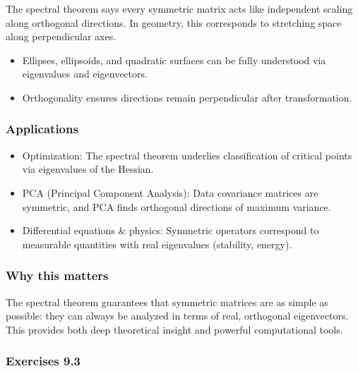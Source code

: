 \documentclass[
  12pt,
  a4paper,
]{article}
\begin{document}
The spectral theorem says every symmetric matrix acts like independent
scaling along orthogonal directions. In geometry, this corresponds to
stretching space along perpendicular axes.

\begin{itemize}
\item
  Ellipses, ellipsoids, and quadratic surfaces can be fully understood
  via eigenvalues and eigenvectors.
\item
  Orthogonality ensures directions remain perpendicular after
  transformation.
\end{itemize}

\subsubsection{Applications}\label{applications-2}

\begin{itemize}
\item
  Optimization: The spectral theorem underlies classification of
  critical points via eigenvalues of the Hessian.
\item
  PCA (Principal Component Analysis): Data covariance matrices are
  symmetric, and PCA finds orthogonal directions of maximum variance.
\item
  Differential equations \& physics: Symmetric operators correspond to
  measurable quantities with real eigenvalues (stability, energy).
\end{itemize}

\subsubsection{Why this matters}\label{why-this-matters-34}

The spectral theorem guarantees that symmetric matrices are as simple as
possible: they can always be analyzed in terms of real, orthogonal
eigenvectors. This provides both deep theoretical insight and powerful
computational tools.

\subsubsection{Exercises 9.3}\label{exercises-93}
\end{document}
